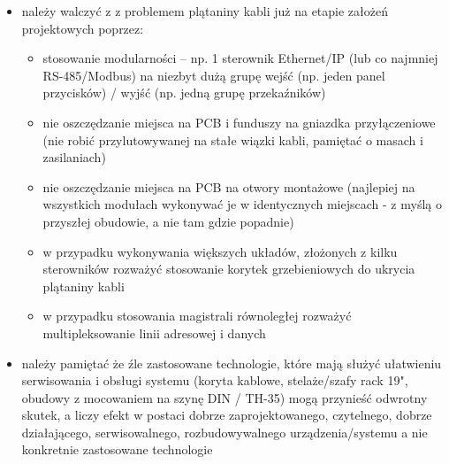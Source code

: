 \begin{itemize}
\begin{itemize}
			\item należy walczyć z z problemem plątaniny kabli już na etapie założeń projektowych poprzez:
				\begin{itemize}
					\item stosowanie modularności – np. 1 sterownik Ethernet/IP (lub co najmniej RS-485/Modbus) na niezbyt dużą grupę wejść (np. jeden panel przycisków) / wyjść (np. jedną grupę przekaźników)
					\item nie oszczędzanie miejsca na PCB i funduszy na gniazdka przyłączeniowe (nie robić przylutowywanej na stałe wiązki kabli, pamiętać o masach i zasilaniach)
					\item nie oszczędzanie miejsca na PCB na otwory montażowe (najlepiej na wszystkich modułach wykonywać je w identycznych miejscach - z myślą o przyszłej obudowie, a nie tam gdzie popadnie)
					\item w przypadku wykonywania większych układów, złożonych z kilku sterowników rozważyć stosowanie korytek grzebieniowych do ukrycia plątaniny kabli
					\item w przypadku stosowania magistrali równoległej rozważyć multipleksowanie linii adresowej i danych
				\end{itemize}
			\item należy pamiętać że źle zastosowane technologie, które mają służyć ułatwieniu serwisowania i obsługi systemu (koryta kablowe, stelaże/szafy rack 19", obudowy z mocowaniem na szynę DIN / TH-35) mogą przynieść odwrotny skutek,
				a liczy efekt w postaci dobrze zaprojektowanego, czytelnego, dobrze działającego, serwisowalnego, rozbudowywalnego urządzenia/systemu a nie konkretnie zastosowane technologie
		\end{itemize}
\end{itemize}
